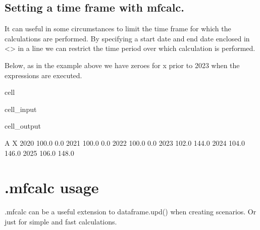 \documentclass[letterpaper,10pt,english]{jupyterBook}
\begin{document}
\subsection{Setting a time frame with mfcalc.}
\label{\detokenize{content/howto/update/extending_dataframes:setting-a-time-frame-with-mfcalc}}
\sphinxAtStartPar
It can useful in some circumstances to limit the time frame for which the calculations are performed. By specifying a start date and end date enclosed in <> in a  line we can restrict the time period over which calculation is performed.

\sphinxAtStartPar
Below, as in the example above we have zeroes for x prior to 2023 when the expressions are executed.

\begin{sphinxuseclass}{cell}\begin{sphinxVerbatimInput}

\begin{sphinxuseclass}{cell_input}
\begin{sphinxVerbatim}[commandchars=\\\{\}]
  


\end{sphinxVerbatim}

\end{sphinxuseclass}\end{sphinxVerbatimInput}
\begin{sphinxVerbatimOutput}

\begin{sphinxuseclass}{cell_output}
\begin{sphinxVerbatim}[commandchars=\\\{\}]
          A      X
2020  100.0    0.0
2021  100.0    0.0
2022  100.0    0.0
2023  102.0  144.0
2024  104.0  146.0
2025  106.0  148.0
\end{sphinxVerbatim}

\end{sphinxuseclass}\end{sphinxVerbatimOutput}

\end{sphinxuseclass}

\section{.mfcalc usage}
\label{\detokenize{content/howto/update/extending_dataframes:mfcalc-usage}}
\sphinxAtStartPar
.mfcalc can be a useful extension to dataframe.upd() when creating scenarios. Or just for simple and fast calculations.
\end{document}
